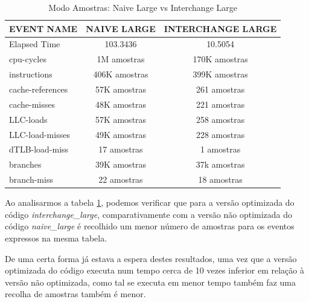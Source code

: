 \documentclass[conference,compsoc]{IEEEtran}
\begin{document}
\begin{table}[h!]
\centering
\begin{tabular}{|l|c|c|}
\hline
\multicolumn{1}{|c|}{\textbf{EVENT NAME}} & \textbf{NAIVE LARGE} & \textbf{INTERCHANGE LARGE} \\ \hline
Elapsed Time                              & 103.3436             & 10.5054                    \\ \hline
cpu-cycles                                & 1M amostras          & 170K amostras              \\ \hline
instructions                              & 406K amostras        & 399K amostras              \\ \hline
cache-references                          & 57K amostras         & 261 amostras               \\ \hline
cache-misses                              & 48K amostras         & 221 amostras               \\ \hline
LLC-loads                                 & 57K amostras         & 258 amostras               \\ \hline
LLC-load-misses                           & 49K amostras         & 228 amostras               \\ \hline
dTLB-load-miss                            & 17 amostras          & 1 amostras                 \\ \hline
branches                                  & 39K amostras         & 37k amostras               \\ \hline
branch-miss                               & 22 amostras          & 18 amostras                \\ \hline
\end{tabular}
\caption{Modo Amostras: Naive Large vs Interchange Large}
\label{table:modo_amostras}
\end{table}

Ao analisarmos a tabela \ref{table:modo_amostras}, podemos verificar que para a versão optimizada do código \textit{interchange\_large}, comparativamente com a versão não optimizada do código \textit{naive\_large} é recolhido um menor número de amostras para os eventos expressos na mesma tabela. 

De uma certa forma já estava a espera destes resultados, uma vez que a versão optimizada do código executa num tempo cerca de 10 vezes inferior em relação à versão não optimizada, como tal se executa em menor tempo também faz uma recolha de amostras também é menor.
\end{document}
